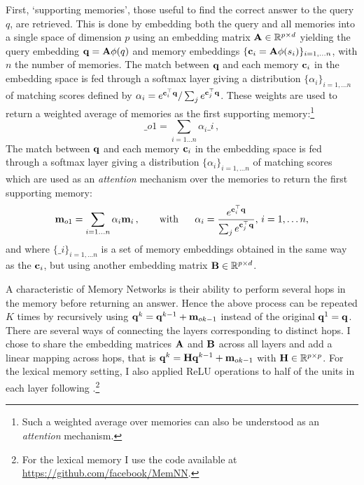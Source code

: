 First, `supporting memories', those useful to find the correct answer to the query $q$, are retrieved. This is done by embedding both the query and all memories into a single space of dimension $p$ using an embedding matrix ${\bf A}\in\mathbb{R}^{p \times d}$ yielding the query embedding  ${\bf q}={\bf A}\phi(q)$ and memory embeddings $\{{\bf c}_i={\bf A}\phi(s_i)\}_{i=1,\dots n}$, with $n$ the number of memories.%
%
The match between ${\bf q}$ and each memory ${\bf c}_i$ in the embedding space is fed through a softmax layer giving a distribution \(\{\alpha_i\}_{i=1, \dots n}\) of matching scores defined by $\alpha_i =  e^{{\bf c}_i^\top{\bf q}} / \sum_j e^{{\bf c}_j^\top{\bf q}}$. These weights are used to return a weighted average of memories as the first supporting memory:\footnote{Such a weighted average over memories can also be understood as an \emph{attention} mechanism.} 
\begin{equation} \label{eq:eq_o}
  \bm_{o1} = \sum_{i=1 \dots n} \alpha_{i} \bm_i \,,
\end{equation}
\fi
The match between ${\bf q}$ and each memory ${\bf c}_i$ in the embedding space is fed through a softmax layer giving a distribution \(\{\alpha_i\}_{i=1, \dots n}\) of matching scores which are used as an \emph{attention} mechanism over the memories to return the first supporting memory:%
\begin{equation} \label{eq:eq_o}
  {\bf m}_{o1} = \sum_{i=1 \dots n} \alpha_{i} {\bf m}_i\,, \mbox{~~~~~~}\text{with~~~~~}\alpha_i =  \frac{e^{{\bf c}_i^\top{\bf q}}}{\sum_j e^{{\bf c}_j^\top{\bf q}}}, \, i=1,\dots n,
\end{equation}
and where $\{\bm_i\}_{i=1,\dots n}$ is a set of memory embeddings obtained in the same way as the ${\bf c}_i$, but using another embedding matrix ${\bf B}\in\mathbb{R}^{p\times d}$.


A characteristic of Memory Networks is their ability to perform several hops in the memory before returning an answer.
%
Hence the above process can be repeated $K$ times by recursively using ${\bf q}^k = {\bf q}^{k-1} + {\bf m}_{ok-1}$ instead of the original ${\bf q}^1={\bf q}$. There are several ways of connecting the layers corresponding to distinct hops. I chose to share the embedding matrices ${\bf A}$ and ${\bf B}$ across all layers and add a linear mapping across hops, that is ${\bf q}^k = {\bf H} {\bf q}^{k-1} + {\bf m}_{ok-1}$ with ${\bf H} \in \mathbb{R}^{p\times p}$. For the lexical memory setting, I also applied ReLU operations to half of the units in each layer following \cite{sukhbaatar2015end}.\footnote{For the lexical memory I use the code available at \url{https://github.com/facebook/MemNN}.}

